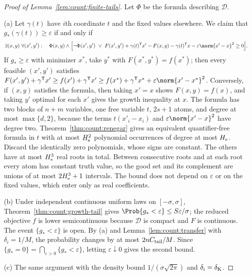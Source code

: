 \begin{proof}[Proof of Lemma~\ref{lem:count:finite-tails}]
Let $\Phi$ be the formula describing $\mathcal D$.

(a) Let $\gamma(t)$ have $i$th coordinate $t$ and the fixed values elsewhere.
We claim that $g_*(\gamma(t))\ge\varepsilon$ if and only if
\[
 \exists(x,y)\ \forall(x',y'):\quad
 \Phi(x,y)\wedge\Bigl[\neg\Phi(x',y')\ \vee\
 F(x',y')+\gamma(t)^{\mathsf T} x'-F(x,y)-\gamma(t)^{\mathsf T} x-\varepsilon\norm{x'-x}^2\ge0\Bigr].
\]
If $g_*\ge\varepsilon$ with minimizer $x^*$, take $y^*$ with
$F(x^*,y^*)=f(x^*)$; then every feasible $(x',y')$ satisfies
$F(x',y')+\gamma^{\mathsf T} x'\ge f(x')+\gamma^{\mathsf T} x'\ge f(x^*)+\gamma^{\mathsf T} x^*+\varepsilon\norm{x'-x^*}^2$.
Conversely, if $(x,y)$ satisfies the formula, then taking $x'=x$ shows
$F(x,y)=f(x)$, and taking $y'$ optimal for each $x'$ gives the growth
inequality at $x$. The formula has two blocks of $n+m$ variables, one free
variable $t$, $2s+1$ atoms, and degree at most $\max\{d,2\}$, because the
terms $t(x'_i-x_i)$ and $\varepsilon\norm{x'-x}^2$ have degree two. Theorem~\ref{thm:count:renegar}
gives an equivalent quantifier-free formula in $t$ with at most $H_{\rm s}^2$
polynomial occurrences of degree at most $H_{\rm s}$. Discard the identically
zero polynomials, whose signs are constant. The others have at most
$H_{\rm s}^3$ real roots in total. Between consecutive roots and at each root
every atom has constant truth value, so the good set and its complement are
unions of at most $2H_{\rm s}^3+1$ intervals. The bound does not depend on
$\varepsilon$ or on the fixed values, which enter only as real coefficients.

(b) Under independent continuous uniform laws on $[-\sigma,\sigma]$,
Theorem~\ref{thm:count:growth-tail} gives
$\Prob\{g_*<\varepsilon\}\le S\varepsilon/\sigma$; the reduced objective $f$
is lower semicontinuous because $\mathcal D$ is compact and $F$ is
continuous. The event $\{g_*<\varepsilon\}$ is open. By (a) and
Lemma~\ref{lem:count:transfer} with $\delta_i=1/M$, the probability changes
by at most $2nC_{\rm tail}/M$. Since $\{g_*=0\}=\bigcap_{\varepsilon>0}\{g_*<\varepsilon\}$,
letting $\varepsilon\downarrow0$ gives the second bound.

(c) The same argument with the density bound $1/(\sigma\sqrt{2\pi})$ and
$\delta_i=\delta_{\rm K}$.


\end{proof}
